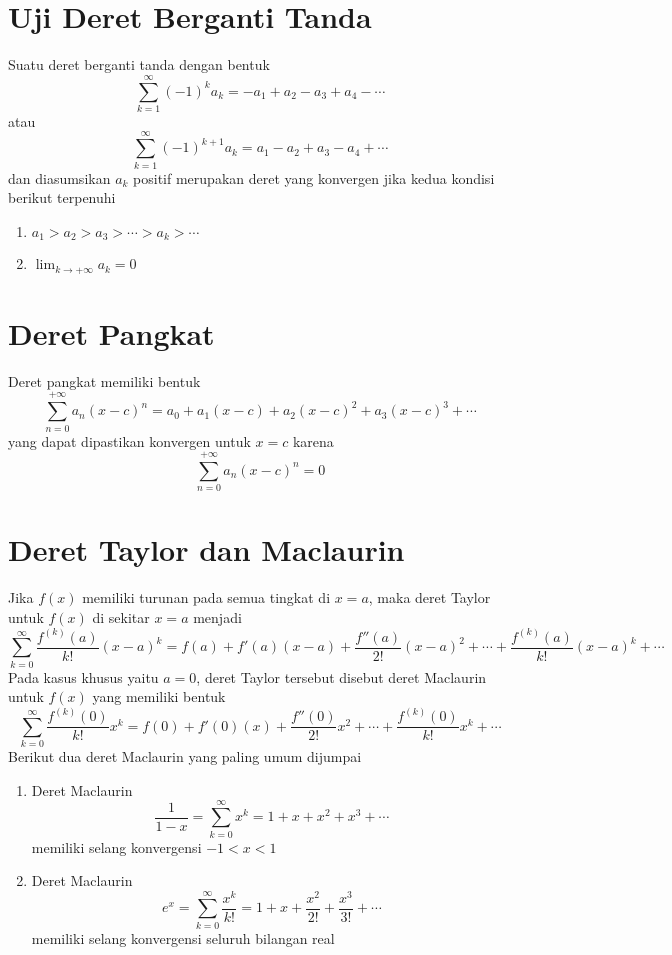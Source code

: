 \documentclass{article}
\begin{document}
\section{Uji Deret Berganti Tanda}
Suatu deret berganti tanda dengan bentuk 
$$ \sum_{k=1}^\infty (-1)^k a_k = -a_1+a_2-a_3+a_4-\cdots $$
atau 
$$ \sum_{k=1}^\infty (-1)^{k+1} a_k = a_1-a_2+a_3-a_4+\cdots $$
dan diasumsikan $a_k$ positif merupakan deret yang konvergen jika kedua kondisi berikut terpenuhi
\begin{enumerate}
	\item $a_1>a_2>a_3>\cdots >a_k>\cdots$
	\item $\displaystyle \lim_{k\rightarrow +\infty} a_k = 0$
\end{enumerate}
\section{Deret Pangkat}
Deret pangkat memiliki bentuk 
$$ \sum_{n=0}^{+\infty} a_n(x-c)^n = a_0+a_1(x-c)+a_2(x-c)^2+a_3(x-c)^3+\cdots $$
yang dapat dipastikan konvergen untuk $x=c$ karena 
$$ \sum_{n=0}^{+\infty} a_n(x-c)^n = 0 $$
\section{Deret Taylor dan Maclaurin}
Jika $f(x)$ memiliki turunan pada semua tingkat di $x=a$, maka deret Taylor untuk $f(x)$ di sekitar $x=a$ menjadi
$$ \sum_{k=0}^\infty \dfrac{f^{(k)}(a)}{k!} (x-a)^k = f(a)+f'(a)(x-a)+\dfrac{f''(a)}{2!}(x-a)^2+\cdots +\dfrac{f^{(k)}(a)}{k!}(x-a)^k +\cdots $$
Pada kasus khusus yaitu $a=0$, deret Taylor tersebut disebut deret Maclaurin untuk $f(x)$ yang memiliki bentuk
$$ \sum_{k=0}^\infty \dfrac{f^{(k)}(0)}{k!} x^k = f(0)+f'(0)(x)+\dfrac{f''(0)}{2!}x^2+\cdots +\dfrac{f^{(k)}(0)}{k!}x^k+\cdots $$
Berikut dua deret Maclaurin yang paling umum dijumpai
\begin{enumerate}
	\item Deret Maclaurin
	$$ \dfrac{1}{1-x} = \sum_{k=0}^\infty x^k = 1+x+x^2+x^3+\cdots $$
	memiliki selang konvergensi $-1<x<1$
	\item Deret Maclaurin
	$$ e^x = \sum_{k=0}^\infty \dfrac{x^k}{k!} = 1+x+\dfrac{x^2}{2!}+\dfrac{x^3}{3!} + \cdots $$
	memiliki selang konvergensi seluruh bilangan real
\end{enumerate}
\end{document}
